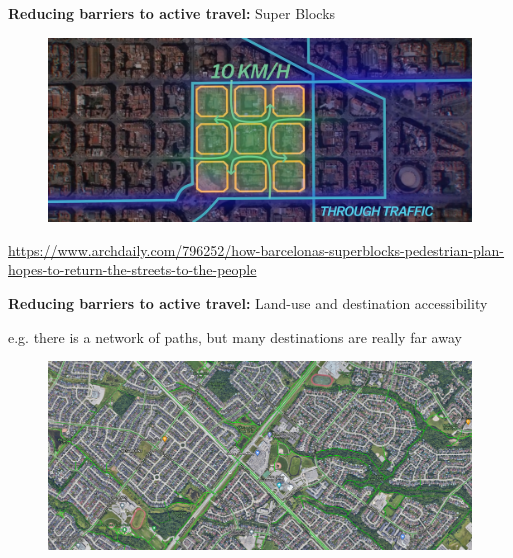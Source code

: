 \documentclass[aspectratio=169]{beamer}
\begin{document}
\begin{frame}
	
	\textbf{Reducing barriers to active travel:} Super Blocks
	
	\begin{figure}
		\centering
		\includegraphics[width=0.8\linewidth]{images/super_blocks.png}
	\end{figure}
	
	\tiny 
	\url{https://www.archdaily.com/796252/how-barcelonas-superblocks-pedestrian-plan-hopes-to-return-the-streets-to-the-people}
	
	
	
\end{frame}



\begin{frame}
	
	\textbf{Reducing barriers to active travel:} Land-use and destination accessibility
	
	\vspace{2mm}
	
	e.g. there is a network of paths, but many destinations are really far away
	
	\begin{figure}
		\centering
		\includegraphics[width=1\linewidth]{images/suburb_bike_lanes.png}
	\end{figure}
	
%	
%	
		
\end{frame}
\end{document}
